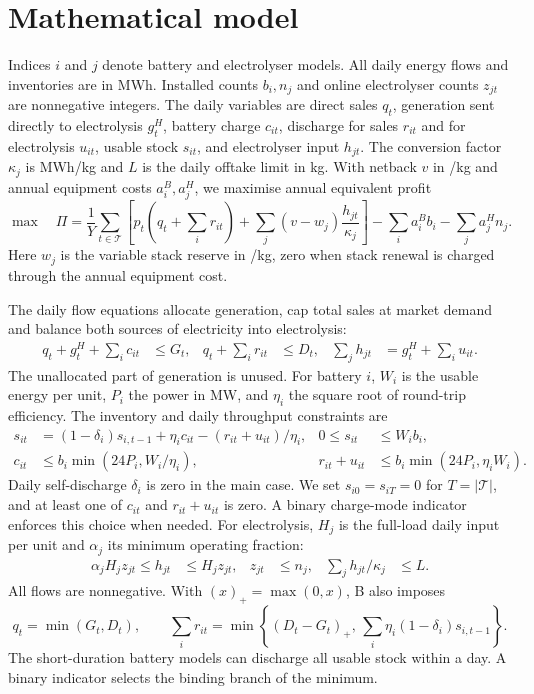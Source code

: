 \section{Mathematical model}\label{sec:model1}
Indices \(i\) and \(j\) denote battery and electrolyser models.
All daily energy flows and inventories are in MWh. Installed counts
\(b_i,n_j\) and online electrolyser counts \(z_{jt}\) are nonnegative
integers. The daily variables are direct sales \(q_t\), generation sent
directly to electrolysis \(g_t^H\), battery charge \(c_{it}\),
discharge for sales \(r_{it}\) and for electrolysis \(u_{it}\), usable stock
\(s_{it}\), and electrolyser input \(h_{jt}\). The conversion factor
\(\kappa_j\) is MWh/kg and \(L\) is the daily offtake limit in kg.
With netback \(v\) in \gbp/kg and annual equipment costs \(a_i^B,a_j^H\),
we maximise annual equivalent profit
\begin{equation}
\max\quad \Pi =
\frac{1}{Y}\sum_{t\in\mathcal T}
\left[p_t\left(q_t+\sum_i r_{it}\right)+
\sum_j (v-w_j)\frac{h_{jt}}{\kappa_j}\right]
-\sum_i a_i^B b_i-\sum_j a_j^H n_j .
\label{eq:profit}
\end{equation}
Here \(w_j\) is the variable stack reserve in \gbp/kg, zero when
stack renewal is charged through the annual equipment cost.

The daily flow equations allocate generation, cap total sales at market
demand and balance both sources of electricity into electrolysis:
\begin{align}
 q_t+g_t^H+\sum_i c_{it}&\le G_t, &
 q_t+\sum_i r_{it}&\le D_t, &
 \sum_j h_{jt}&=g_t^H+\sum_i u_{it}. \label{eq:flow}
\end{align}
The unallocated part of generation is unused. For battery \(i\), \(W_i\)
is the usable energy per unit, \(P_i\) the power in MW, and \(\eta_i\)
the square root of round-trip efficiency. The inventory and daily throughput
constraints are
\begin{align}
s_{it}&=(1-\delta_i)s_{i,t-1}+\eta_i c_{it}-(r_{it}+u_{it})/\eta_i,
 & 0\le s_{it}&\le W_i b_i, \label{eq:stock}\\
c_{it}&\le b_i\min(24P_i,W_i/\eta_i),
 & r_{it}+u_{it}&\le b_i\min(24P_i,\eta_i W_i). \label{eq:window}
\end{align}
Daily self-discharge \(\delta_i\) is zero in the main case. We set
\(s_{i0}=s_{iT}=0\) for \(T=|\mathcal T|\), and at least one of \(c_{it}\)
and \(r_{it}+u_{it}\) is zero. A binary charge-mode indicator enforces
this choice when needed. For electrolysis, \(H_j\) is the full-load daily
input per unit and \(\alpha_j\) its minimum operating fraction:
\begin{align}
\alpha_j H_j z_{jt}\le h_{jt}&\le H_j z_{jt}, &
z_{jt}&\le n_j, &
\sum_j h_{jt}/\kappa_j&\le L. \label{eq:hydrogen}
\end{align}
All flows are nonnegative. With \((x)_+=\max(0,x)\), B also imposes
\begin{equation}
q_t=\min(G_t,D_t), \qquad
\sum_i r_{it}=\min\!\left\{(D_t-G_t)_+,\,
            \sum_i\eta_i(1-\delta_i)s_{i,t-1}\right\}.
\label{eq:priority}
\end{equation}
The short-duration battery models can discharge all usable stock within
a day. A binary indicator selects the binding branch of the minimum.

